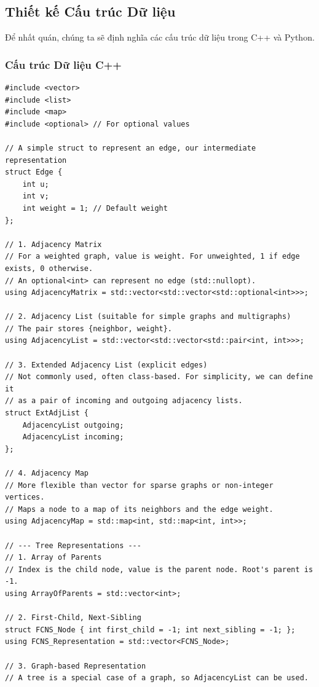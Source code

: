 \documentclass[a4paper,12pt]{article}
\begin{document}
\subsection{Thiết kế Cấu trúc Dữ liệu}
Để nhất quán, chúng ta sẽ định nghĩa các cấu trúc dữ liệu trong C++ và Python.

\subsubsection{Cấu trúc Dữ liệu C++}
\begin{lstlisting}[style=cppstyle, caption={Định nghĩa các cấu trúc dữ liệu biểu diễn đồ thị trong C++.}, label={lst:cpp_structures_4}]
#include <vector>
#include <list>
#include <map>
#include <optional> // For optional values

// A simple struct to represent an edge, our intermediate representation
struct Edge {
    int u;
    int v;
    int weight = 1; // Default weight
};

// 1. Adjacency Matrix
// For a weighted graph, value is weight. For unweighted, 1 if edge exists, 0 otherwise.
// An optional<int> can represent no edge (std::nullopt).
using AdjacencyMatrix = std::vector<std::vector<std::optional<int>>>;

// 2. Adjacency List (suitable for simple graphs and multigraphs)
// The pair stores {neighbor, weight}.
using AdjacencyList = std::vector<std::vector<std::pair<int, int>>>;

// 3. Extended Adjacency List (explicit edges)
// Not commonly used, often class-based. For simplicity, we can define it
// as a pair of incoming and outgoing adjacency lists.
struct ExtAdjList {
    AdjacencyList outgoing;
    AdjacencyList incoming;
};

// 4. Adjacency Map
// More flexible than vector for sparse graphs or non-integer vertices.
// Maps a node to a map of its neighbors and the edge weight.
using AdjacencyMap = std::map<int, std::map<int, int>>;

// --- Tree Representations ---
// 1. Array of Parents
// Index is the child node, value is the parent node. Root's parent is -1.
using ArrayOfParents = std::vector<int>;

// 2. First-Child, Next-Sibling
struct FCNS_Node { int first_child = -1; int next_sibling = -1; };
using FCNS_Representation = std::vector<FCNS_Node>;

// 3. Graph-based Representation
// A tree is a special case of a graph, so AdjacencyList can be used.
\end{lstlisting}
\end{document}
